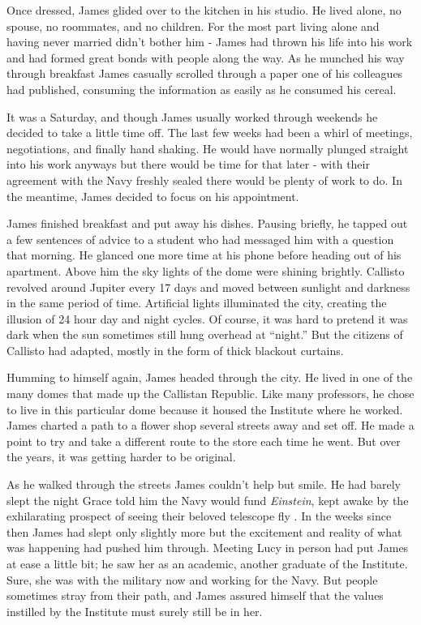 \documentclass[12pt]{article} %
\begin{document}
Once dressed, James glided over to the kitchen in his studio. He lived alone, no spouse, no roommates, and no children. For the most part living alone and having never married didn't bother him - James had thrown his life into his work and had formed great bonds with people along the way. As he munched his way through breakfast James casually scrolled through a paper one of his colleagues had published, consuming the information as easily as he consumed his cereal.

It was a Saturday, and though James usually worked through weekends he decided to take a little time off. The last few weeks had been a whirl of meetings, negotiations, and finally hand shaking. He would have normally plunged straight into his work anyways but there would be time for that later - with their agreement with the Navy freshly sealed there would be plenty of work to do. In the meantime, James decided to focus on his appointment.

James finished breakfast and put away his dishes. Pausing briefly, he tapped out a few sentences of advice to a student who had messaged him with a question that morning. He glanced one more time at his phone before heading out of his apartment. Above him the sky lights of the dome were shining brightly. Callisto revolved around Jupiter every 17 days and moved between sunlight and darkness in the same period of time. Artificial lights illuminated the city, creating the illusion of 24 hour day and night cycles. Of course, it was hard to pretend it was dark when the sun sometimes still hung overhead at ``night.'' But the citizens of Callisto had adapted, mostly in the form of thick blackout curtains.

Humming to himself again, James headed through the city. He lived in one of the many domes that made up the Callistan Republic. Like many professors, he chose to live in this particular dome because it housed the Institute where he worked. James charted a path to a flower shop several streets away and set off. He made a point to try and take a different route to the store each time he went. But over the years, it was getting harder to be original.

As he walked through the streets James couldn't help but smile. He had barely slept the night Grace told him the Navy would fund \textit{Einstein}, kept awake by the exhilarating prospect of seeing their beloved telescope fly . In the weeks since then James had slept only slightly more but the excitement and reality of what was happening had pushed him through. Meeting Lucy in person had put James at ease a little bit; he saw her as an academic, another graduate of the Institute. Sure, she was with the military now and working for the Navy. But people sometimes stray from their path, and James assured himself that the values instilled by the Institute must surely still be in her.
\end{document}
